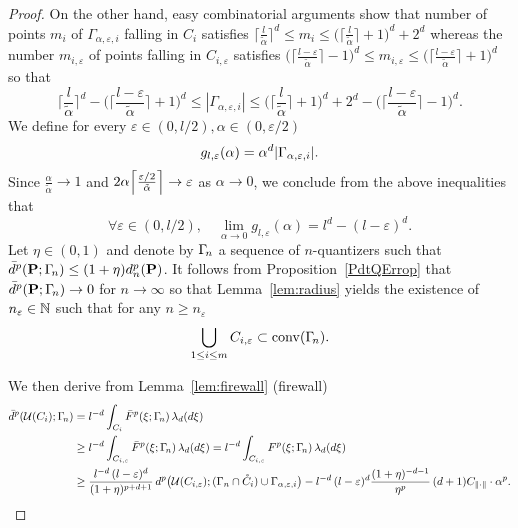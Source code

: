 \begin{proof}
 On the other hand, easy combinatorial arguments show that number of points $m_i$ of $\Gamma_{\alpha,\varepsilon,i}$ falling in $C_i$ satisfies $\lceil \frac{l}{\tilde \alpha}\rceil^d \le m_i \le \big(\lceil \frac{l}{\tilde \alpha}\rceil+1\big)^d +2^d$ whereas the number $m_{i,\varepsilon}$ of points falling in $C_{i,\varepsilon}$ satisfies  $\big(\lceil \frac{l-\varepsilon}{\tilde \alpha}\rceil-1\big)^d \le m_{i,\varepsilon} \le \big(\lceil \frac{l-\varepsilon}{\tilde \alpha}\rceil+1\big)^d$ so that
 \[
\Big\lceil\frac{l}{\tilde \alpha}\Big\rceil^d - \Big(\Big\lceil\frac{l-\varepsilon}{\tilde \alpha}\Big\rceil+1\Big)^d \le  |\Gamma_{\alpha,\varepsilon,i}| \le \Big(\Big\lceil\frac{l}{\tilde \alpha}\Big\rceil+1\Big)^d +2^d-\Big(\Big\lceil\frac{l-\varepsilon}{\tilde \alpha}\Big\rceil-1\Big)^d.
 \]
%
%
We define for every $\varepsilon\in(0,l/2), \alpha\in(0,\varepsilon/2)$
\[
	g_{l,\varepsilon}(\alpha) = \alpha^d \lvert\Gamma_{\alpha,\varepsilon,i}\rvert.
\]
Since $\frac{\alpha}{\tilde{\alpha}} \to 1$ and $2\alpha \Bigl\lceil
	\frac{\varepsilon/2}{\tilde{\alpha}} \Bigr\rceil \to \varepsilon$ as $\alpha
	\to 0$, we conclude from the above inequalities that
	\begin{equation}\label{eq:proofFirewallDefgl}
	\forall \varepsilon \in (0, l/2),\quad	\lim_{\alpha \to 0} g_{l,\varepsilon}(\alpha) = l^d - (l-\varepsilon)^d.	 
	\end{equation}	
Let $\eta\in(0,1)$ and denote by $\Gamma_{\!n}$ a sequence of
$n$-quantizers such that $\bar d^p(\mathbf{P}; \Gamma_{\!n}) \leq (1+\eta)
d^p_n(\mathbf{P})$. It follows from Proposition~\ref{PdtQErrop} that
$\bar d^p(\mathbf{P}; \Gamma_{\!n}) \to 0$ for $n\to \infty$ so that 
Lemma~\ref{lem:radius} yields the existence of $n_\varepsilon\in\mathbb{N}$ such that for any $n\geq n_\varepsilon$
\[
\bigcup_{1\leq i \leq m} C_{i,\varepsilon} \subset \operatorname{conv}(\Gamma_{\!n}).
\]

We then derive from Lemma~\ref{lem:firewall} (firewall) %
\begin{equation*}
\begin{split}
  \bar d^p(\mathcal{U}(C_i); \Gamma_{\!n}) & = l^{-d} \int_{C_i} \bar F^p(\xi; \Gamma_{\!n})\,
  \lambda_d(d\xi) \\
  & \geq l^{-d} \int_{C_{i,\varepsilon}} \bar F^p(\xi; \Gamma_{\!n})\,
  \lambda_d(d\xi) = l^{-d} \int_{C_{i,\varepsilon}} F^p(\xi; \Gamma_{\!n})\,
  \lambda_d(d\xi) \\
  & \geq \frac{l^{-d }\,(l-\varepsilon)^d}{(1+\eta)^{p+d+1}}\, d^p\bigl(\mathcal{U}(C_{i,\varepsilon});
  (\Gamma_n\cap\mathring C_i)\cup \Gamma_{\alpha,\varepsilon,i}\bigr) -
  l^{-d}\,(l-\varepsilon)^d \frac{(1+\eta)^{-d-1}}{\eta^{p}}\, (d+1) C_{\lVert\cdot\rVert}\cdot\alpha^p.
\end{split}
\end{equation*}


\end{proof}
